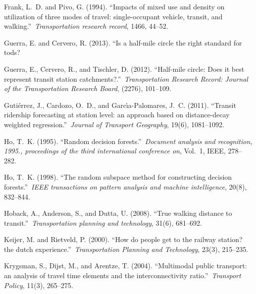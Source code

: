 \documentclass[sustainability,article,submit,moreauthors,pdftex,10pt,a4paper]{Definitions/mdpi}
\begin{document}
\begin{thebibliography}{999}
	Frank, L.~D. and Pivo, G. (1994).
	\newblock ``Impacts of mixed use and density on utilization of three modes of
	travel: single-occupant vehicle, transit, and walking.''\ {\em Transportation
		research record}, 1466, 44--52.
	
	Guerra, E. and Cervero, R. (2013).
	\newblock ``Is a half-mile circle the right standard for tods?
	
	Guerra, E., Cervero, R., and Tischler, D. (2012).
	\newblock ``Half-mile circle: Does it best represent transit station
	catchments?.''\ {\em Transportation Research Record: Journal of the
		Transportation Research Board}, (2276), 101--109.
	
	Guti{\'e}rrez, J., Cardozo, O.~D., and Garc{\'\i}a-Palomares, J.~C. (2011).
	\newblock ``Transit ridership forecasting at station level: an approach based
	on distance-decay weighted regression.''\ {\em Journal of Transport
		Geography}, 19(6), 1081--1092.
	
	Ho, T.~K. (1995).
	\newblock ``Random decision forests.''\ {\em Document analysis and recognition,
		1995., proceedings of the third international conference on}, Vol.~1, IEEE,
	278--282.
	
	Ho, T.~K. (1998).
	\newblock ``The random subspace method for constructing decision forests.''\
	{\em IEEE transactions on pattern analysis and machine intelligence}, 20(8),
	832--844.
	
	Hoback, A., Anderson, S., and Dutta, U. (2008).
	\newblock ``True walking distance to transit.''\ {\em Transportation planning
		and technology}, 31(6), 681--692.
	
	Keijer, M. and Rietveld, P. (2000).
	\newblock ``How do people get to the railway station? the dutch experience.''\
	{\em Transportation Planning and Technology}, 23(3), 215--235.
	
	Krygsman, S., Dijst, M., and Arentze, T. (2004).
	\newblock ``Multimodal public transport: an analysis of travel time elements
	and the interconnectivity ratio.''\ {\em Transport Policy}, 11(3), 265--275.
	

\end{thebibliography}
\end{document}

